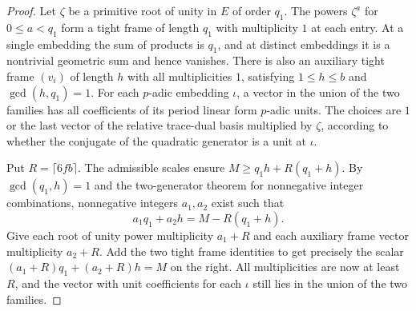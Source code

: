 \begin{proof}
Let $\zeta$ be a primitive root of unity in $E$ of order $q_1$. The powers $\zeta^a$ for $0\le a<q_1$ form a tight frame of length $q_1$ with multiplicity $1$ at each entry. At a single embedding the sum of products is $q_1$, and at distinct embeddings it is a nontrivial geometric sum and hence vanishes. There is also an auxiliary tight frame $(v_i)$ of length $h$ with all multiplicities $1$, satisfying $1\le h\le b$ and $\gcd(h,q_1)=1$. For each $p$-adic embedding $\iota$, a vector in the union of the two families has all coefficients of its period linear form $p$-adic units. The choices are $1$ or the last vector of the relative trace-dual basis multiplied by $\zeta$, according to whether the conjugate of the quadratic generator is a unit at $\iota$.

Put $R=\lceil6fb\rceil$. The admissible scales ensure $M\ge q_1h+R(q_1+h)$. By $\gcd(q_1,h)=1$ and the two-generator theorem for nonnegative integer combinations, nonnegative integers $a_1,a_2$ exist such that
\[
 a_1q_1+a_2h=M-R(q_1+h).
\]
Give each root of unity power multiplicity $a_1+R$ and each auxiliary frame vector multiplicity $a_2+R$. Add the two tight frame identities to get precisely the scalar $(a_1+R)q_1+(a_2+R)h=M$ on the right. All multiplicities are now at least $R$, and the vector with unit coefficients for each $\iota$ still lies in the union of the two families.
\end{proof}

